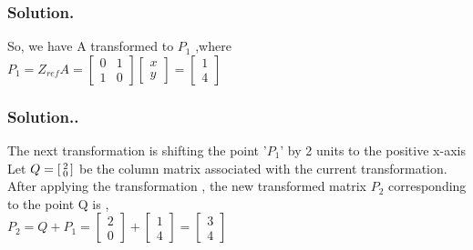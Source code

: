\documentclass{beamer}
\begin{document}
\begin{frame}
\frametitle{Solution.}
So, we have A transformed to $P_{1}$ ,where\\
\quad \quad \quad \quad \quad \quad $ P_1 = Z_{ref}A = \begin{bmatrix} 0 & 1  \\ 1 & 0 \end{bmatrix}  \begin{bmatrix} x \\y \end{bmatrix} = \begin{bmatrix} 1 \\4 \end{bmatrix} $

\end{frame}

\begin{frame} 
\frametitle{Solution..}
The next transformation is shifting the point '$P_{1}$' by 2 units to \break the positive x-axis\\
Let $Q=  \begin{bsmallmatrix} 2\\0 \end{bsmallmatrix} $ be the column matrix associated with the current transformation.\\
After applying the transformation , the new transformed matrix $P_{2} $ corresponding to the point Q is ,\\
\quad \quad \quad\quad $P_2 = Q + P_1 = \begin{bmatrix} 2\\0 \end{bmatrix}  + \begin{bmatrix} 1\\4 \end{bmatrix} = \begin{bmatrix} 3\\4 \end{bmatrix}   $


\end{frame}
\end{document}
